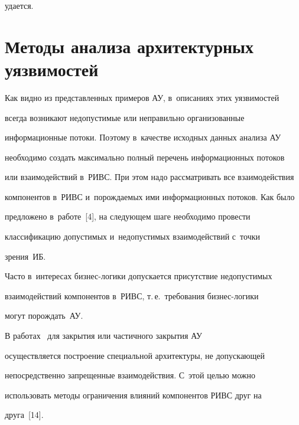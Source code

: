 удается. 





\vspace*{-4pt}


  


\section{Методы анализа архитектурных уязвимостей}





  Как видно из представленных примеров АУ, в~описаниях этих уязвимостей 


всегда возникают недопустимые или неправильно организованные 


информационные потоки. Поэтому в~качестве исходных данных анализа АУ 


необходимо создать максимально полный перечень информационных потоков 


или взаимодействий в~РИВС. При этом надо рассматривать все взаимодействия 


компонентов в~РИВС и~порождаемых ими информационных потоков. Как было 


предложено в~работе~[4], на следующем шаге необходимо провести 


классификацию допустимых и~недопустимых взаимодействий с~точки 


зрения~ИБ. 


  


  Часто в~интересах бизнес-логики допускается присутствие недопустимых 


взаимодействий компонентов в~РИВС, т.\,е.\ требования биз\-нес-ло\-ги\-ки 


могут порождать~АУ. 


  


  В работах~\cite{4-g2, 5-g2, 13-g2} для закрытия или частичного закрытия АУ 


осуществляется построение специальной архитектуры, не допускающей 


непосредственно запрещенные взаимодействия. С~этой целью можно 


использовать методы ограничения влияний компонентов РИВС друг на 


друга~[14].





